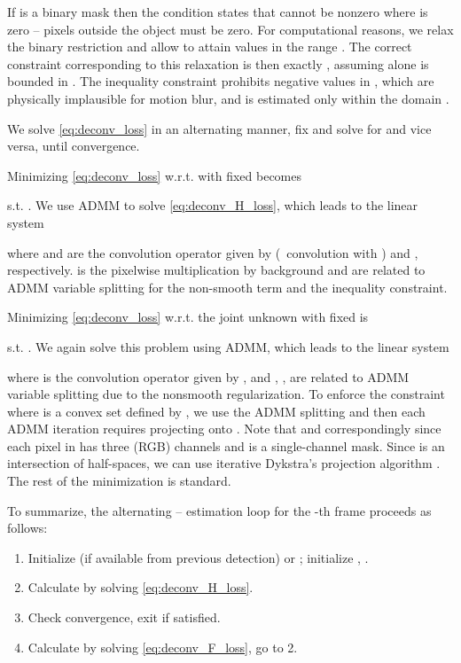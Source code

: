 \documentclass[10pt,twocolumn,letterpaper]{article}
\begin{document}
If  is a binary mask then the condition  states that  cannot be nonzero where  is zero -- pixels outside the object must be zero. For computational reasons, we relax the binary restriction and allow  to attain values in the range . The correct constraint corresponding to this relaxation is then exactly , assuming  alone is bounded in . The inequality constraint  prohibits negative values in , which are physically implausible for motion blur, and  is estimated only within the domain .

We solve \eqref{eq:deconv_loss} in an alternating manner, fix  and solve for  and vice versa,
until convergence.

Minimizing \eqref{eq:deconv_loss} w.r.t.  with  fixed becomes

s.t. . We use ADMM to solve \eqref{eq:deconv_H_loss}, which leads to the linear system

where  and  are the convolution operator given by  (\ie~convolution with ) and , respectively.  is the pixelwise multiplication by background  and  are related to ADMM variable splitting for the non-smooth  term and the inequality constraint.

Minimizing \eqref{eq:deconv_loss} w.r.t. the joint unknown  with  fixed is

s.t. .
We again solve this problem using ADMM, which leads to the linear system

where  is the convolution operator given by , and , ,  are related to ADMM variable splitting due to the nonsmooth regularization. To enforce the constraint  where  is a convex set defined by , we use the ADMM splitting  and then each ADMM iteration requires projecting  onto . Note that  and correspondingly  since each pixel in  has three (RGB) channels and  is a single-channel mask. Since  is an intersection of half-spaces, we can use iterative Dykstra's projection algorithm \cite{dykstra}. The rest of the minimization is standard.

To summarize, the alternating -- estimation loop for the -th frame proceeds as follows:
\vspace*{-0.5em}
\begin{enumerate}[leftmargin=*]
	\setlength\itemsep{-0.25em}
	\item Initialize  (if available from previous detection) or ; initialize , .
	\item Calculate  by solving \eqref{eq:deconv_H_loss}.
	\item Check convergence, exit if satisfied.
	\item Calculate  by solving \eqref{eq:deconv_F_loss}, go to 2.
\end{enumerate}
\end{document}
